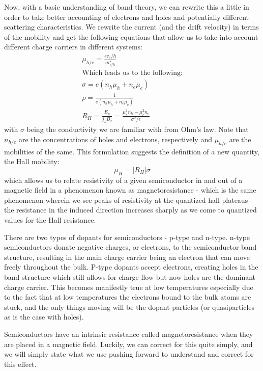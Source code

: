 \documentclass[reprint, nobibnotes, amssymb, amsmath, amsfonts, physics, mathtools, mathrsfs, floatfix]{revtex4-1}
\begin{document}
    Now, with a basic understanding of band theory, we can rewrite this a little in order to take better accounting of electrons and holes and potentially different scattering characteristics.  We rewrite the current (and the drift velocity) in terms of the mobility and get the following equations that allow us to take into account different charge carriers in different systems:
    \begin{gather}
      \mu_{h/e} = \frac{e \tau_e/h}{m_{e/h}^*} \label{mobility} \\
      \text{Which leads us to the following:} \nonumber \\
      \sigma = e(n_h\mu_h + n_e\mu_e) \label{conductivity} \\
      \rho = \frac{1}{e(n_h\mu_h + n_e\mu_e)} \label{resistivity} \\
      R_H = \frac{E_y}{j_x B_z} = \frac{\mu_h^2 n_h - \mu_e^2 n_e}{\sigma^2/e} \label{mobilites_hallcoeff}
    \end{gather}
    with $\sigma$ being the conductivity we are familiar with from Ohm's law.  Note that $n_{h/e}$ are the concentrations of holes and electrons, respectively and $\mu_{h/e}$ are the mobilities of the same.  This formulation suggests the definition of a new quantity, the Hall mobility:
    \begin{equation}
      \mu_H = |R_H|\sigma \label{hall_mobility}
    \end{equation}
    which allows us to relate resistivity of a given semiconductor in and out of a magnetic field in a phenomenon known as magnetoresistance - which is the same phenomenon wherein we see peaks of resistivity at the quantized hall plateaus - the resistance in the induced direction increases sharply as we come to quantized values for the Hall resistance.

    There are two types of dopants for semiconductors - p-type and n-type.  n-type semiconductors donate negative charges, or electrons, to the semiconductor band structure, resulting in the main charge carrier being an electron that can move freely throughout the bulk.  P-type dopants accept electrons, creating holes in the band structure which still allows for charge flow but now holes are the dominant charge carrier.  This becomes manifestly true at low temperatures especially due to the fact that at low temperatures the electrons bound to the bulk atoms are stuck, and the only things moving will be the dopant particles (or quasiparticles as is the case with holes).

    Semiconductors have an intrinsic resistance called magnetoresistance when they are placed in a magnetic field.  Luckily, we can correct for this quite simply, and we will simply state what we use pushing forward to understand and correct for this effect.
\end{document}
